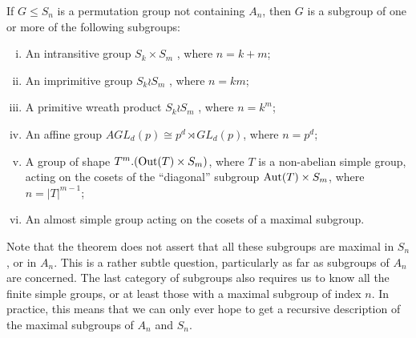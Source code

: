 \begin{theorem} 
 If $G \leq S_n$ is a permutation group not containing $A_n$, then $G$
is a subgroup of one or more of the following subgroups:
\begin{enumerate}[(i)]
\item An intransitive group $S_k \times S_m$ , where $n = k + m$;
\item An imprimitive group $S_k \wr S_m$ , where $n = km$;
\item A primitive wreath product $S_k \wr S_m$ , where $n = k^m$;
\item An affine group $AGL_d(p) \cong p^d \rtimes GL_d(p)$, where $n=p^d$;
\item A group of shape $T^m.(\mathrm{Out}(T) \times S_m)$, where $T$ is a non-abelian simple
group, acting on the cosets of the ``diagonal'' subgroup $\operatorname{Aut}(T)\times S_m$, where
$n = |T|^{m-1}$;
\item An almost simple group acting on the cosets of a maximal subgroup.
\end{enumerate}
\end{theorem}
Note that the theorem does not assert that all these subgroups are maximal
in $S_n$, or in $A_n$. This is a rather subtle question, particularly as far as subgroups
of $A_n$ are concerned. The last category of subgroups also requires us to know all
the finite simple groups, or at least those with a maximal subgroup of index $n$.
In practice, this means that we can only ever hope to get a recursive description
of the maximal subgroups of $A_n$ and $S_n$.
